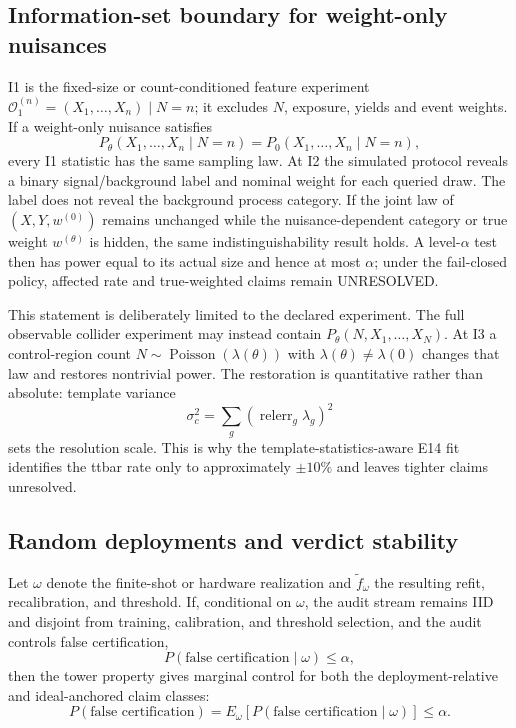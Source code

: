 \documentclass[11pt,a4paper]{article}
\begin{document}
\subsection{Information-set boundary for weight-only nuisances}
\label{supp:weight-only}

I1 is the fixed-size or count-conditioned feature experiment
$\mathcal O_1^{(n)}=(X_1,\ldots,X_n)\mid N=n$; it excludes $N$, exposure,
yields and event weights. If a weight-only nuisance satisfies
\[
 P_\theta(X_1,\ldots,X_n\mid N=n)=P_0(X_1,\ldots,X_n\mid N=n),
\]
every I1 statistic has the same sampling law. At I2 the simulated protocol
reveals a binary signal/background label and nominal weight for each queried
draw. The label does not reveal the background process category. If the joint
law of $(X,Y,w^{(0)})$ remains unchanged while the nuisance-dependent category
or true weight $w^{(\theta)}$ is hidden, the same indistinguishability result
holds. A level-$\alpha$ test then has power equal to its actual size and hence
at most $\alpha$; under the fail-closed policy, affected rate and true-weighted
claims remain UNRESOLVED.

This statement is deliberately limited to the declared experiment. The full
observable collider experiment may instead contain
$P_\theta(N,X_1,\ldots,X_N)$. At I3 a control-region count
$N\sim\operatorname{Poisson}(\lambda(\theta))$ with
$\lambda(\theta)\ne\lambda(0)$ changes that law and restores nontrivial power.
The restoration is quantitative rather than absolute:
template variance
\[
 \sigma_c^2=\sum_g(\operatorname{relerr}_g\lambda_g)^2
\]
sets the resolution scale. This is why the template-statistics-aware E14
fit identifies the ttbar rate only to approximately $\pm10\%$ and leaves
tighter claims unresolved.

\subsection{Random deployments and verdict stability}
\label{supp:random-deployments}

Let $\omega$ denote the finite-shot or hardware realization and
$\widetilde f_\omega$ the resulting refit, recalibration, and threshold.
If, conditional on $\omega$, the audit stream remains IID and disjoint from
training, calibration, and threshold selection, and the audit controls false certification,
\[
 P(\text{false certification}\mid\omega)\leq\alpha,
\]
then the tower property gives marginal control for both the
deployment-relative and ideal-anchored claim classes:
\[
 P(\text{false certification})
 =E_\omega[P(\text{false certification}\mid\omega)]\leq\alpha.
\]
\end{document}
